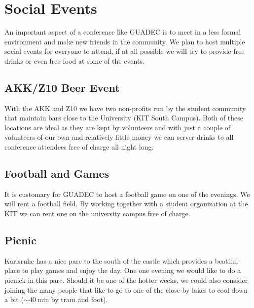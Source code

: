 \newpage

\section{Social Events}

An important aspect of a conference like GUADEC is to meet in a less formal
environment and make new friends in the community. We plan to host multiple
social events for everyone to attend, if at all possible we will try to
provide free drinks or even free food at some of the events.

\begin{multicols}{2}
\raggedcolumns

\subsection{AKK/Z10 Beer Event}

With the AKK and Z10 we have two non-profits run by the student community that
maintain bars close to the University (KIT South Campus).
Both of these locations are ideal as they are kept by volunteers and with just
a couple of volunteers of our own and relatively little money we can
server drinks to all conference attendees free of charge all night long.

\subsection{Football and Games}

It is customary for GUADEC to host a football game on one of the evenings. We will
rent a football field. By working together with a student organization at the
KIT we can rent one on the university campus free of charge.

\subsection{Picnic}

Karlsruhe has a nice parc to the south of the castle which provides a beatiful
place to play games and enjoy the day. One one evening we would like to do
a picnick in this parc. Should it be one of the hotter weeks, we could also
consider joining the many people that like to go to one of the close-by lakes
to cool down a bit ($\sim\SI{40}{\minute}$ by tram and foot).

\columnbreak


\end{multicols}
